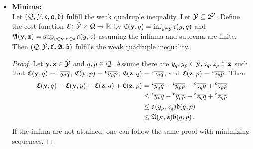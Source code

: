 \begin{itemize}
\begin{equation*}
	\end{equation*}
	also fulfills the quadruple inequality.
	\begin{proof}
		We have
		\begin{align*}
			&\mf C(y,q) - \mf C( z,q) -\mf C(y,p)+\mf C(z,p)
			\\&= 
			\int \mf c(\omega; y(\omega),q(\omega)) -  \mf c(\omega; y(\omega),p(\omega))\\
			 &\qquad- \mf c(\omega; z(\omega),q(\omega)) + \mf c(\omega; z(\omega),p(\omega))\dl \mu(\omega)
			\\&\leq 
			\int \mf a(\omega; y(\omega),z(\omega)) \mf b(\omega; q(\omega),p(\omega))\dl \mu(\omega)
			\\&\leq 
			\mf A(y,z) \mf B(q, p)
			\eqcm
		\end{align*}
		by Hölder's inequality.
	\end{proof}
\item[]\hspace*{-0.5cm}\textbf{Minima:}\\
	Let $(\mathcal{Q}, \mathcal{Y}, \mathfrak{c}, \mathfrak{a}, \mathfrak{b})$ fulfill the weak quadruple inequality. Let $\tilde{\mathcal{Y}} \subseteq 2^{\mathcal{Y}}$. Define the cost function $\mathfrak{C} \colon \tilde{\mathcal{Y}} \times \mathcal{Q} \to \mathbb{R}$ by $\mathfrak{C}(\mathbf{y}, q) = \inf_{y\in\mathbf{y}} \mathfrak{c}(y,q)$ and
	$\mathfrak{A}(\mathbf{y},\mathbf{z}) = \sup_{y\in\mathbf{y},z\in\mathbf{z}} \mathfrak{a}(y,z)$ assuming the infinma and suprema are finite. Then $(\mathcal{Q}, \tilde{\mathcal{Y}}, \mathfrak{C}, \mathfrak{A}, \mathfrak{b})$ fulfills the weak quadruple inequality.
	\begin{proof}
	Let $\mathbf{y},\mathbf{z}\in \tilde{\mathcal{Y}}$ and  $q ,p\in \mathcal{Q}$.
	Assume there are $y_q, y_p \in \mathbf{y}, z_q, z_p \in \mathbf{z}$ such that $\mf C(\mo y,q) = \olc {y_{q}}{q}$, $\mf C(\mo y,p) = \olc {y_{p}}{p}$, $\mf C(\mo z,q) = \olc {z_{q}}{q}$, and $\mf C(\mo z,p) = \olc {z_{p}}{p}$. Then
	\begin{align*}
		\mf C(\mo y,q) - \mf C(\mo y,p) - \mf C(\mo z,q) + \mf C(\mo z,p)
		&=
		\olc {y_{q}}{q} - \olc {y_{p}}{p} - \olc {z_{q}}{q} + \olc {z_{p}}{p}
		\\&\leq
		\olc {y_{p}}{q} - \olc {y_{p}}{p} - \olc {z_{q}}{q} + \olc {z_{q}}{p}
		\\&\leq
		\mf a(y_{p},z_{q}) \mf b(q, p) 
		\\&\leq
		\mf A(\mo y,\mo z) \mf b(q,p)
		\eqfs
	\end{align*}
	If the infima are not attained, one can follow the same proof with minimizing sequences.
	\end{proof} 

\end{itemize}

